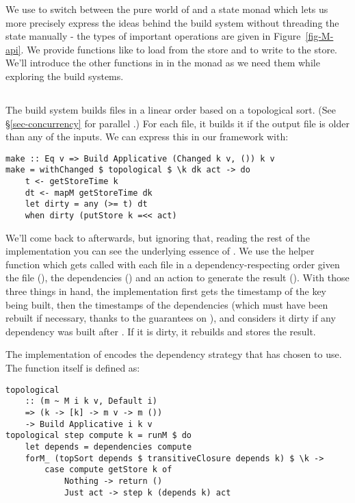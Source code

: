 We use  to switch between the pure world of  and a state monad  which lets us more precisely express the ideas behind the build system without threading the state manually - the types of important operations are given in Figure~\ref{fig-M-api}. We provide functions like  to load from the store and  to write to the store. We'll introduce the other functions in in the monad  as we need them while exploring the build systems.

\subsection{\Make}\label{sec-implementation-make}

The \Make build system builds files in a linear order based on a topological sort.
(See \S\ref{sec-concurrency} for parallel \Make.)
For each file, it builds it if the output file is older than any of the inputs. We can express this in our framework with:

\begin{verbatim}
make :: Eq v => Build Applicative (Changed k v, ()) k v
make = withChanged $ topological $ \k dk act -> do
    t <- getStoreTime k
    dt <- mapM getStoreTime dk
    let dirty = any (>= t) dt
    when dirty (putStore k =<< act)
\end{verbatim}

We'll come back to  afterwards, but ignoring that, reading the rest of the implementation you can see the underlying essence of \Make. We use the helper function  which gets called with each file in a dependency-respecting order given the file (), the dependencies () and an action to generate the result (). With those three things in hand, the implementation first gets the timestamp of the key being built, then the timestamps of the dependencies (which must have been rebuilt if necessary, thanks to the guarantees on ), and considers it dirty if any dependency was built after . If it is dirty, it rebuilds and stores the result.

The implementation of  encodes the dependency strategy that \Make has chosen to use. The function itself is defined as:

\begin{verbatim}
topological
    :: (m ~ M i k v, Default i)
    => (k -> [k] -> m v -> m ())
    -> Build Applicative i k v
topological step compute k = runM $ do
    let depends = dependencies compute
    forM_ (topSort depends $ transitiveClosure depends k) $ \k ->
        case compute getStore k of
            Nothing -> return ()
            Just act -> step k (depends k) act
\end{verbatim}

